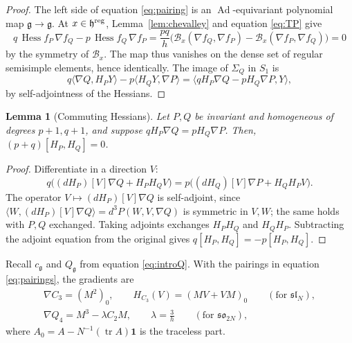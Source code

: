 \documentclass[10pt,reqno]{amsart}
\numberwithin{equation}{section}
\theoremstyle{plain}
\newtheorem{lemma}[theorem]{Lemma}
\theoremstyle{definition}
\DeclareMathOperator{\tr}{tr}
\DeclareMathOperator{\Ad}{Ad}
\DeclareMathOperator{\Hess}{Hess}
\newcommand{\ip}[2]{\langle #1, #2\rangle}
\begin{document}
\begin{proof}
The left side of equation \eqref{eq:pairing} is an $\Ad$-equivariant polynomial map $\mathfrak{g}\to\mathfrak{g}$. At $x\in\mathfrak{h}^{\rm reg}$, Lemma~\ref{lem:chevalley} and equation \eqref{eq:TP} give
\begin{equation*}
	q\,\Hess f_P\,\nabla f_Q-p\,\Hess f_Q\,\nabla f_P=\frac{pq}h\Big(\mathcal{B}_x(\nabla f_Q,\nabla f_P)-\mathcal{B}_x(\nabla f_P,\nabla f_Q)\Big)=0
\end{equation*}
by the symmetry of $\mathcal{B}_x$. The map thus vanishes on the dense set of regular semisimple elements, hence identically. The image of $\Sigma_Q$ in $S_1$ is 
\begin{equation*}
    q\ip{\nabla Q}{H_PY}-p\ip{H_QY}{\nabla P}=\ip{qH_P\nabla Q-pH_Q\nabla P}{Y},
\end{equation*}
by self-adjointness of the Hessians.
\end{proof}

\begin{lemma}[Commuting Hessians]\label{lem:commute}
Let $P,Q$ be invariant and homogeneous of degrees $p+1,q+1$, and suppose $qH_P\nabla Q=pH_Q\nabla P$. Then, $(p+q)[H_P,H_Q]=0$.
\end{lemma}

\begin{proof}
Differentiate in a direction $V$:
\begin{equation*}
	q\big((dH_P)[V]\nabla Q+H_PH_QV\big)=p\big((dH_Q)[V]\nabla P+H_QH_PV\big).
\end{equation*}
The operator $V\mapsto(dH_P)[V]\nabla Q$ is self-adjoint, since $\ip W{(dH_P)[V]\nabla Q}=d^3P(W,V,\nabla Q)$ is symmetric in $V,W$; the same holds with $P,Q$ exchanged. Taking adjoints exchanges $H_PH_Q$ and $H_QH_P$. Subtracting the adjoint equation from the original gives $q[H_P,H_Q]=-p[H_P,H_Q]$.
\end{proof}

Recall $c_\mathfrak{g}$ and $Q_\mathfrak{g}$ from equation \eqref{eq:introQ}. With the pairings in equation \eqref{eq:pairings}, the gradients are
\begin{equation}\label{eq:gradQ}
\begin{gathered}
	\nabla C_3=(M^2)_0,\qquad H_{C_3}(V)=(MV+VM)_0\qquad(\text{for }\mathfrak{sl}_N),\\
	\nabla Q_4=M^3-\lambda C_2M,\qquad \lambda=\frac3h\qquad(\text{for }\mathfrak{so}_{2N}),
\end{gathered}
\end{equation}
where $A_0=A-N^{-1}(\tr A)\mathbf 1$ is the traceless part.
\end{document}
